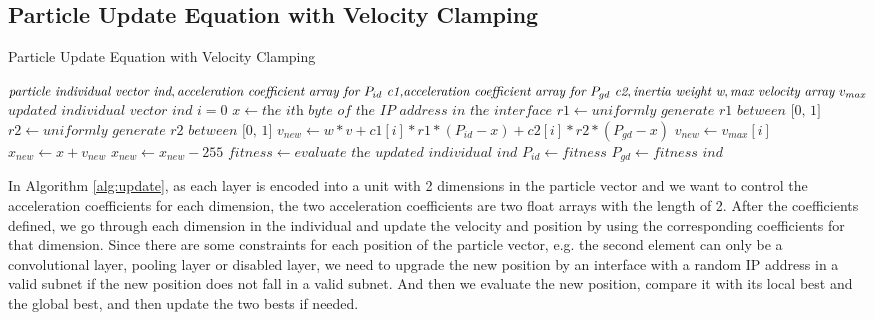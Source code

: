 \documentclass[conference]{IEEEtran}
\begin{document}
\subsection{Particle Update Equation with Velocity Clamping}
\begin{algorithm}
	\caption{Particle Update Equation with Velocity Clamping}
	\label{alg:update}
	\begin{algorithmic}
		\renewcommand{\algorithmicrequire}{\textbf{Input:}}
		\renewcommand{\algorithmicensure}{\textbf{Output:}}
		\REQUIRE $\textit{particle individual vector ind}, \newline \textit{acceleration coefficient array for $P_{id}$ c1,} \newline \textit{acceleration coefficient array for $P_{gd}$ c2}, \newline \textit{inertia weight w}, \newline \textit{max velocity array } v_{max}$
		\ENSURE $\textit{updated individual vector ind}$
			\STATE $i=0$
				\STATE $x \leftarrow \textit{the ith byte of the IP address in the interface}$
				\STATE $r1 \leftarrow \textit{uniformly generate r1 between [0, 1]}$
				\STATE $r2 \leftarrow \textit{uniformly generate r2 between [0, 1]}$
				\STATE $v_{new} \leftarrow w * v + c1[i] * r1 * (P_{id} - x) + c2[i] * r2 * (P_{gd} - x)$
					\STATE $v_{new} \leftarrow v_{max}[i]$
				\ENDIF
				\STATE $x_{new} \leftarrow x + v_{new}$
					\STATE $x_{new} \leftarrow x_{new}-255$
				\ENDIF
			\ENDFOR
		\ENDFOR
		\STATE $fitness \leftarrow \textit{evaluate the updated individual ind}$
			\STATE $P_{id} \leftarrow fitness$
		\ENDIF
		\STATE $P_{gd} \leftarrow fitness$
		\ENDIF
		\RETURN $ind$
	\end{algorithmic}
\end{algorithm}

In Algorithm \ref{alg:update}, as each layer is encoded into a unit with 2 dimensions in the particle vector and we want to control the acceleration coefficients for each dimension, the two acceleration coefficients are two float arrays with the length of 2. 
After the coefficients defined, we go through each dimension in the individual and update the velocity and position by using the corresponding coefficients for that dimension. Since there are some constraints for each position of the particle vector, e.g. the second element can only be a convolutional layer, pooling layer or disabled layer, we need to upgrade the new position by an interface with a random IP address in a valid subnet if the new position does not fall in a valid subnet. And then we evaluate the new position, compare it with its local best and the global best, and then update the two bests if needed.
\end{document}

